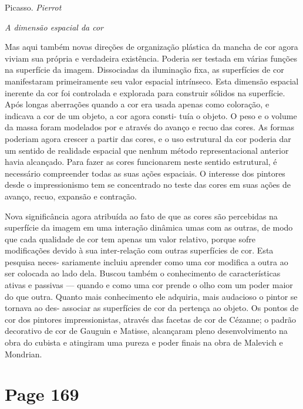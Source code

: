 \documentclass[a4paper]{article}
\begin{document}
\par
\noindent Picasso. \textit{Pierrot}

\par
\noindent \textit{A dimensão espacial da cor}

\par
Mas aqui também novas direções de organização plástica
da mancha de cor agora viviam sua própria e verdadeira existência. Poderia ser testada em várias
funções na superfície da imagem. Dissociadas da iluminação fixa, as
superfícies de cor manifestaram primeiramente seu valor espacial intrínseco. Esta
dimensão espacial inerente da cor foi controlada e explorada para construir
sólidos na superfície. Após longas aberrações quando a cor era usada
apenas como coloração, e indicava a cor de um objeto, a cor agora consti-
tuía o objeto. O peso e o volume da massa foram modelados por
e através do avanço e recuo das cores. As formas poderiam agora crescer a partir
das cores, e o uso estrutural da cor poderia dar um sentido de realidade
espacial que nenhum método representacional anterior havia alcançado. Para fazer
as cores funcionarem neste sentido estrutural, é necessário compreender todas
as suas ações espaciais. O interesse dos pintores desde o impressionismo
tem se concentrado no teste das cores em suas ações de avanço, recuo,
expansão e contração.

Nova significância agora atribuída ao fato de que as cores são percebidas na
superfície da imagem em uma interação dinâmica umas com as outras, de modo que cada
qualidade de cor tem apenas um valor relativo, porque sofre modificações
devido à sua inter-relação com outras superfícies de cor. Esta pesquisa neces-
sariamente incluiu aprender como uma cor modifica a outra ao ser colocada
ao lado dela. Buscou também o conhecimento de características ativas e passivas ---
quando e como uma cor prende o olho com um poder maior do que outra.
Quanto mais conhecimento ele adquiria, mais audacioso o pintor se tornava ao des-
associar as superfícies de cor da pertença ao objeto. Os pontos de cor dos
pintores impressionistas, através das facetas de cor de Cézanne; o padrão
decorativo de cor de Gauguin e Matisse, alcançaram pleno desenvolvimento na obra
do cubista e atingiram uma pureza e poder finais na obra de Malevich
e Mondrian.

\par
{}

\newpage
\section*{Page 169}
\end{document}
